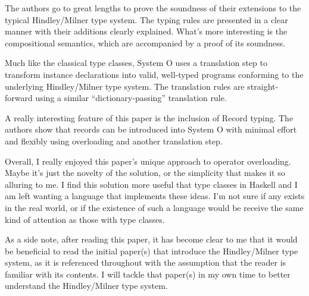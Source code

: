 \documentclass[a4paper,fleqn,notitlepage]{scrartcl}
\begin{document}
The authors go to great lengths to prove the soundness of their extensions to
the typical Hindley/Milner type system. The typing rules are presented in a
clear manner with their additions clearly explained. What's more interesting is
the compositional semantics, which are accompanied by a proof of its soundness.

Much like the classical type classes, System O uses a translation step to
transform instance declarations into valid, well-typed programs conforming to the
underlying Hindley/Milner type system. The translation rules are straight-forward
using a similar ``dictionary-passing'' translation rule.

A really interesting feature of this paper is the inclusion of Record typing.
The authors show that records can be introduced into System O with minimal effort
and flexibly using overloading and another translation step.

Overall, I really enjoyed this paper's unique approach to operator overloading.
Maybe it's just the novelty of the solution, or the simplicity that makes it
so alluring to me. I find this solution more useful that type classes in Haskell
and I am left wanting a language that implements these ideas. I'm not sure if
any exists in the real world, or if the existence of such a language would be
receive the same kind of attention as those with type classes.

As a side note, after reading this paper, it has become clear to me that it would
be beneficial to read the initial paper(s) that introduce the Hindley/Milner type
system, as it is referenced throughout with the assumption that the reader is
familiar with its contents. I will tackle that paper(s) in my own time to better
understand the Hindley/Milner type system.
\end{document}
